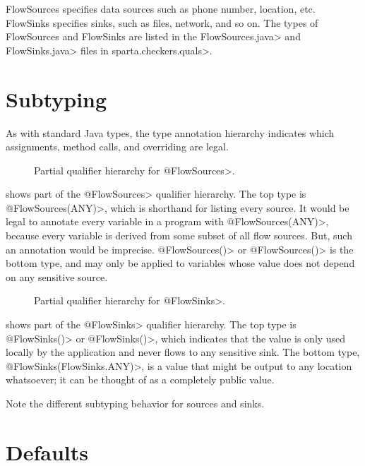 FlowSources specifies data sources such as phone number, location, 
etc.  FlowSinks specifies sinks, such as files, network, and so on.
The types of FlowSources and FlowSinks are listed in the
\<FlowSources.java> and \<FlowSinks.java> files in \<sparta.checkers.quals>.


\section{Subtyping}

As with standard Java types, the type annotation hierarchy indicates which
assignments, method calls, and overriding are legal.


\begin{figure}
\caption{Partial qualifier hierarchy for \<@FlowSources>.}
\label{fig:flowsources-hierarchy}
\end{figure}

 shows part of the \<@FlowSources>
qualifier hierarchy.  The top type is \<@FlowSources(ANY)>, which is
shorthand for listing every source.  It would be legal to annotate every
variable in a program with \<@FlowSources(ANY)>, because every variable is
derived from some subset of all flow sources.  But, such an annotation
would be imprecise.  \<@FlowSources(\ttcbs)> or \<@FlowSources()> is the
bottom type, and may only
be applied to variables whose value does not depend on any sensitive
source.


\begin{figure}
\caption{Partial qualifier hierarchy for \<@FlowSinks>.}
\label{fig:flowsinks-hierarchy}
\end{figure}

 shows part of the \<@FlowSinks>
qualifier hierarchy.  The top type is \<@FlowSinks(\ttcbs)> or
\<@FlowSinks()>, which indicates
that the value is only used locally by the application and never flows to
any sensitive sink.  The bottom type, \<@FlowSinks(FlowSinks.ANY)>, is a
value that might be output to any location whatsoever; it can be thought of
as a completely public value.

Note the different subtyping behavior for sources and sinks.


\section{Defaults\label{flow-defaults}}

